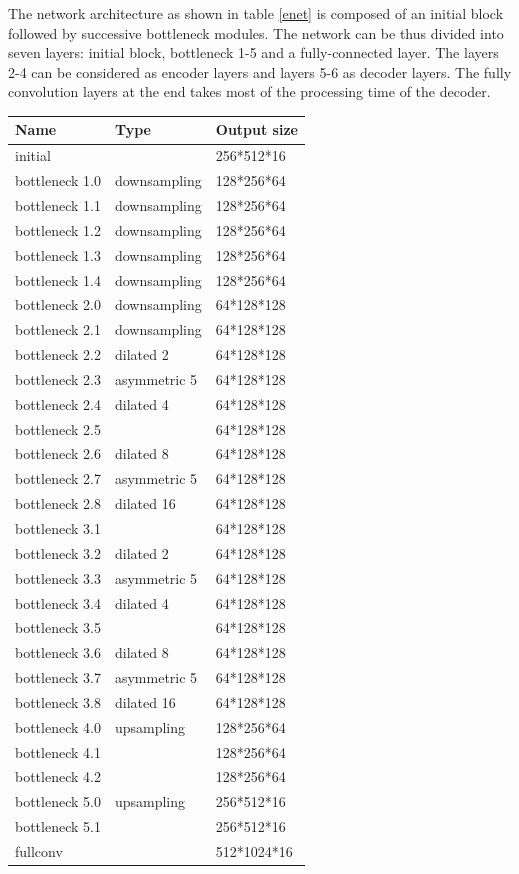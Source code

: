 \documentclass[a4paper, 12pt, oneside, BCOR1cm,toc=chapterentrywithdots]{scrbook}
\begin{document}
The network architecture as shown in table \ref{enet} is composed of an initial block followed by successive bottleneck modules. The network can be thus divided into seven layers: initial block, bottleneck 1-5 and a fully-connected layer. The layers 2-4 can be considered as encoder layers and layers 5-6 as decoder layers. The fully convolution layers at the end takes most of the processing time of the decoder.

\begin{center}
\label{enet}
\begin{tabular}{| l | l | l |}
\hline
Name & Type & Output size\\
\hline
initial &  & 256*512*16\\
\hline
bottleneck 1.0 & downsampling & 128*256*64\\
bottleneck 1.1 & downsampling & 128*256*64\\
bottleneck 1.2 & downsampling & 128*256*64\\
bottleneck 1.3 & downsampling & 128*256*64\\
bottleneck 1.4 & downsampling & 128*256*64\\
\hline
bottleneck 2.0 & downsampling & 64*128*128\\
bottleneck 2.1 & downsampling & 64*128*128\\
bottleneck 2.2 & dilated 2 & 64*128*128\\
bottleneck 2.3 & asymmetric 5 & 64*128*128\\
bottleneck 2.4 & dilated 4 & 64*128*128\\
bottleneck 2.5 &   & 64*128*128\\
bottleneck 2.6 & dilated 8   & 64*128*128\\
bottleneck 2.7 & asymmetric 5   & 64*128*128\\
bottleneck 2.8 & dilated 16   & 64*128*128\\
\hline
bottleneck 3.1 &   & 64*128*128\\
bottleneck 3.2 & dilated 2 & 64*128*128\\
bottleneck 3.3 & asymmetric 5 & 64*128*128\\
bottleneck 3.4 & dilated 4 & 64*128*128\\
bottleneck 3.5 &  & 64*128*128\\ 
bottleneck 3.6 & dilated 8 & 64*128*128\\
bottleneck 3.7 & asymmetric 5 & 64*128*128\\
bottleneck 3.8 & dilated 16 & 64*128*128\\
\hline
bottleneck 4.0 & upsampling  & 128*256*64\\ 
bottleneck 4.1 &   & 128*256*64\\ 
bottleneck 4.2 &   & 128*256*64\\ 
\hline
bottleneck 5.0 & upsampling & 256*512*16\\ 
bottleneck 5.1 &   & 256*512*16\\
\hline
fullconv & & 512*1024*16\\
\hline
\end{tabular}
\end{center}
\end{document}
